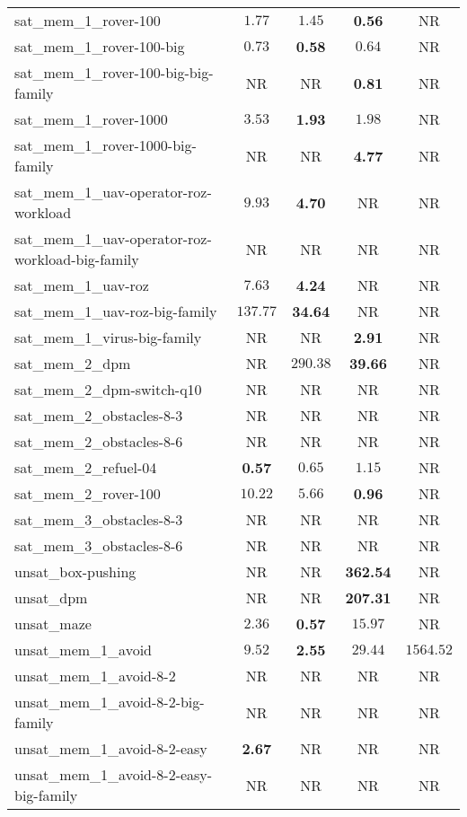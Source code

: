 \begin{tabular}{lcccc}
sat\_mem\_1\_rover-100 & $1.77$ & $1.45$ & \textbf{0.56} & NR \\
sat\_mem\_1\_rover-100-big & $0.73$ & \textbf{0.58} & $0.64$ & NR \\
sat\_mem\_1\_rover-100-big-big-family & NR & NR & \textbf{0.81} & NR \\
sat\_mem\_1\_rover-1000 & $3.53$ & \textbf{1.93} & $1.98$ & NR \\
sat\_mem\_1\_rover-1000-big-family & NR & NR & \textbf{4.77} & NR \\
sat\_mem\_1\_uav-operator-roz-workload & $9.93$ & \textbf{4.70} & NR & NR \\
sat\_mem\_1\_uav-operator-roz-workload-big-family & NR & NR & NR & NR \\
sat\_mem\_1\_uav-roz & $7.63$ & \textbf{4.24} & NR & NR \\
sat\_mem\_1\_uav-roz-big-family & $137.77$ & \textbf{34.64} & NR & NR \\
sat\_mem\_1\_virus-big-family & NR & NR & \textbf{2.91} & NR \\
sat\_mem\_2\_dpm & NR & $290.38$ & \textbf{39.66} & NR \\
sat\_mem\_2\_dpm-switch-q10 & NR & NR & NR & NR \\
sat\_mem\_2\_obstacles-8-3 & NR & NR & NR & NR \\
sat\_mem\_2\_obstacles-8-6 & NR & NR & NR & NR \\
sat\_mem\_2\_refuel-04 & \textbf{0.57} & $0.65$ & $1.15$ & NR \\
sat\_mem\_2\_rover-100 & $10.22$ & $5.66$ & \textbf{0.96} & NR \\
sat\_mem\_3\_obstacles-8-3 & NR & NR & NR & NR \\
sat\_mem\_3\_obstacles-8-6 & NR & NR & NR & NR \\
unsat\_box-pushing & NR & NR & \textbf{362.54} & NR \\
unsat\_dpm & NR & NR & \textbf{207.31} & NR \\
unsat\_maze & $2.36$ & \textbf{0.57} & $15.97$ & NR \\
unsat\_mem\_1\_avoid & $9.52$ & \textbf{2.55} & $29.44$ & $1564.52$ \\
unsat\_mem\_1\_avoid-8-2 & NR & NR & NR & NR \\
unsat\_mem\_1\_avoid-8-2-big-family & NR & NR & NR & NR \\
unsat\_mem\_1\_avoid-8-2-easy & \textbf{2.67} & NR & NR & NR \\
unsat\_mem\_1\_avoid-8-2-easy-big-family & NR & NR & NR & NR \\

\end{tabular}
